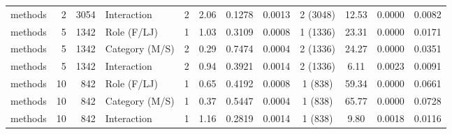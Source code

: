 \begin{landscape}
\begin{table}[H]
\begin{tabular}{l r r l ccc r ccc r}
methods & 2 & 3054 & Interaction & 2 & 2.06 & 0.1278 & 0.0013 & 2 (3048) & 12.53 & 0.0000 & 0.0082 \\ 
methods & 5 & 1342 & Role (F/LJ) & 1 & 1.03 & 0.3109 & 0.0008 & 1 (1336) & 23.31 & 0.0000 & 0.0171 \\ 
methods & 5 & 1342 & Category (M/S) & 2 & 0.29 & 0.7474 & 0.0004 & 2 (1336) & 24.27 & 0.0000 & 0.0351 \\ 
methods & 5 & 1342 & Interaction & 2 & 0.94 & 0.3921 & 0.0014 & 2 (1336) & 6.11 & 0.0023 & 0.0091 \\ 
methods & 10 & 842 & Role (F/LJ) & 1 & 0.65 & 0.4192 & 0.0008 & 1 (838) & 59.34 & 0.0000 & 0.0661 \\ 
methods & 10 & 842 & Category (M/S) & 1 & 0.37 & 0.5447 & 0.0004 & 1 (838) & 65.77 & 0.0000 & 0.0728 \\ 
methods & 10 & 842 & Interaction & 1 & 1.16 & 0.2819 & 0.0014 & 1 (838) & 9.80 & 0.0018 & 0.0116 \\ 
\bottomrule
\end{tabular}%
\label{tab:codebase_graph_latex_repository_graph_component_time_series_ART_anova} 
\end{table}
\end{landscape}
\newpage 
